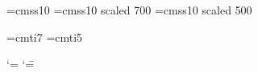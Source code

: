 \def\makenumeralsfam#1{%
	\mathcode`\0="0#130%
	\mathcode`\1="0#131%
	\mathcode`\2="0#132%
	\mathcode`\3="0#133%
	\mathcode`\4="0#134%
	\mathcode`\5="0#135%
	\mathcode`\6="0#136%
	\mathcode`\7="0#137%
	\mathcode`\8="0#138%
	\mathcode`\9="0#139%
}



\font\tenss=cmss10
\font\sevenss=cmss10 scaled 700%
\font\fivess=cmss10 scaled 500%

\def\ssmath{%
	\setfam{15}{ss}{ten}{seven}{five}%
	\everymath{\fam15}%
	\makenumeralsfam0%
}



\font\sevenit=cmti7
\font\fiveit=cmti5

\def\itmath{%
	\setfam{15}{it}{ten}{seven}{five}%
	\everymath{\fam15}%
	\makenumeralsfam0%
}


%

\newdimen\heightmodelinitialbarheight
\newdimen\heightmodelbaradvance
\newdimen\heightmodelbarwidth
\newdimen\heightmodelspace

\heightmodelinitialbarheight=16pt%
\heightmodelbaradvance=8pt%
\heightmodelbarwidth=6pt%
\heightmodelspace=8pt%


\newdimen\heightmodelbarheight
\def\resetheightmodelbarheight{\heightmodelbarheight=\heightmodelinitialbarheight}

\def\heightmodelbar{\vrule height\heightmodelbarheight width\heightmodelbarwidth}

\def\heightmodelitem{%
	\ensureline\vbox\bgroup%
		\halign\bgroup%
			\hss##\hss\cr%
			\hbox{\heightmodelbar}\cr%
}
\def\endheightmodelitem{\cr\egroup\egroup}

\begingroup
\catcode`\<=\active
\catcode`\==\active%
\gdef\heightmodel{\ensureline\hbox\bgroup%
	\resetheightmodelbarheight%
	\catcode`\<\active%
	\catcode`\=\active%
	\def={%
		\endheightmodelitem%
		\hskip\heightmodelspace%
		\heightmodelitem%
	}%
	\def<{%
		\endheightmodelitem%
		\advance\heightmodelbarheight by\heightmodelbaradvance%
		\hskip\heightmodelspace%
		\heightmodelitem%
	}%
	\ignoreallspaces%
	\let\par\relax%
	\obeylines%
	\heightmodelitem%
}
\endgroup

\def\endheightmodel{\endheightmodelitem\egroup}
